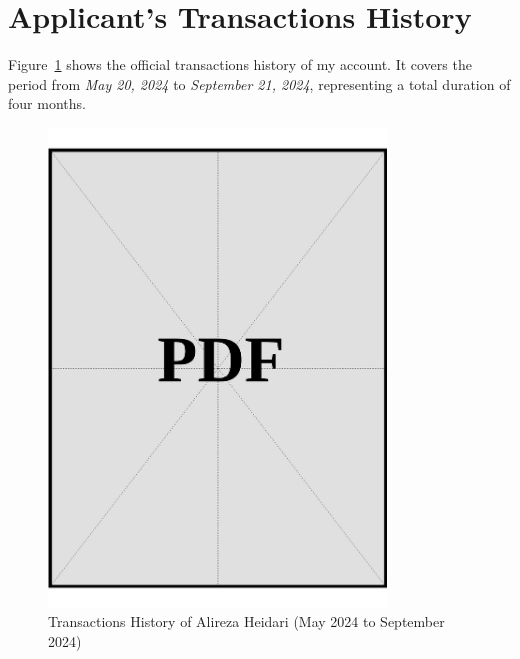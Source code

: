 \clearpage

\section{Applicant's Transactions History}
\label{sec:applicant-transactions-history}

\noindent
Figure~\ref{fig:applicant-transactions-history} shows the official transactions history of my account. It covers the period from \textit{May 20, 2024} to \textit{September 21, 2024}, representing a total duration of four months.

\vspace*{\fill}
\begin{figure}[h]
    \centering
    \includegraphics[page=1, width=0.8\textwidth]{../docs/applicant/funds/bank-account/transaction-history.pdf}
    \caption{Transactions History of Alireza Heidari (May 2024 to September 2024)}
    \label{fig:applicant-transactions-history}
\end{figure}
\vspace*{\fill}

\clearpage
